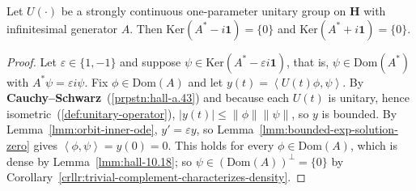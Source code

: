 \begin{lemma}
    \label{lmm:generator-ker-adjoint-trivial}
    \leanok
    Let $U(\cdot)$ be a strongly continuous one-parameter unitary group on $\mathbf{H}$ with infinitesimal generator $A$. Then $\text{Ker}(A^* - i\mathbf{1}) = \{0\}$ and $\text{Ker}(A^* + i\mathbf{1}) = \{0\}$.
\end{lemma}
\begin{proof}
    \leanok
Let $\varepsilon \in \{1, -1\}$ and suppose $\psi \in \text{Ker}(A^* - \varepsilon i\mathbf{1})$, that is, $\psi \in \text{Dom}(A^*)$ with $A^*\psi = \varepsilon i\psi$. Fix $\phi \in \text{Dom}(A)$ and let $y(t) = \left< U(t)\phi, \psi \right>$. By \textbf{Cauchy–Schwarz}~(\ref{prpstn:hall-a.43}) and because each $U(t)$ is unitary, hence isometric~(\ref{def:unitary-operator}), $\lvert y(t) \rvert \le \left\| \phi \right\| \left\| \psi \right\|$, so $y$ is bounded. By Lemma~\ref{lmm:orbit-inner-ode}, $y' = \varepsilon y$, so Lemma~\ref{lmm:bounded-exp-solution-zero} gives $\left< \phi, \psi \right> = y(0) = 0$. This holds for every $\phi \in \text{Dom}(A)$, which is dense by Lemma~\ref{lmm:hall-10.18}; so $\psi \in \left( \text{Dom}(A) \right)^\perp = \{0\}$ by Corollary~\ref{crllr:trivial-complement-characterizes-density}.
\end{proof}

